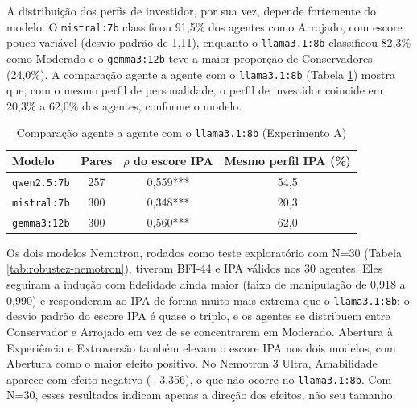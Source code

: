A distribuição dos perfis de investidor, por sua vez, depende fortemente do modelo.
O \texttt{mistral:7b} classificou 91,5\% dos agentes como Arrojado, com
escore pouco variável (desvio padrão de 1,11), enquanto o
\texttt{llama3.1:8b} classificou 82,3\% como Moderado e o
\texttt{gemma3:12b} teve a maior proporção de Conservadores (24,0\%). A
comparação agente a agente com o \texttt{llama3.1:8b} (Tabela
\ref{tab:robustez-modelos-pareada}) mostra que, com o mesmo perfil de
personalidade, o perfil de investidor coincide em 20,3\% a 62,0\% dos
agentes, conforme o modelo.

\begin{table}[htb]
    \caption{Comparação agente a agente com o \texttt{llama3.1:8b} (Experimento A)}
    \label{tab:robustez-modelos-pareada}
    \centering
    \begin{tabular}{lccc}
        \toprule
        Modelo & Pares & $\rho$ do escore IPA & Mesmo perfil IPA (\%) \\
        \midrule
        \texttt{qwen2.5:7b}  & 257 & 0,559*** & 54,5 \\
        \texttt{mistral:7b}  & 300 & 0,348*** & 20,3 \\
        \texttt{gemma3:12b}  & 300 & 0,560*** & 62,0 \\
        \bottomrule
    \end{tabular}
\end{table}

Os dois modelos Nemotron, rodados como teste exploratório com N=30
(Tabela \ref{tab:robustez-nemotron}), tiveram BFI-44 e IPA válidos nos 30
agentes. Eles seguiram a indução com fidelidade ainda maior (faixa de
manipulação de 0,918 a 0,990) e responderam ao IPA de forma muito mais
extrema que o \texttt{llama3.1:8b}: o desvio padrão do escore IPA é quase
o triplo, e os agentes se distribuem entre Conservador e Arrojado em vez
de se concentrarem em Moderado. Abertura à Experiência e Extroversão
também elevam o escore IPA nos dois modelos, com Abertura como o maior
efeito positivo. No Nemotron 3 Ultra, Amabilidade aparece com efeito
negativo ($-$3,356), o que não ocorre no \texttt{llama3.1:8b}. Com N=30,
esses resultados indicam apenas a direção dos efeitos, não seu tamanho.

